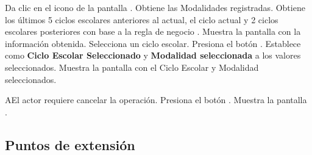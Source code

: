 \begin{UCtrayectoria}	

    \UCpaso[\UCactor] \label{cancelar}Da clic en el icono \IUEditar de la pantalla .
    \UCpaso Obtiene las Modalidades registradas.
    \UCpaso Obtiene los últimos 5 ciclos escolares anteriores al actual, el ciclo actual y 2 ciclos escolares posteriores con base a la regla de negocio .
    \UCpaso Muestra la pantalla  con la información obtenida.
    \UCpaso [\UCactor] Selecciona un ciclo escolar.
    \UCpaso [\UCactor] \label{IN-DES-CU2:acp} Presiona el botón . %
    \UCpaso Establece como {\bf Ciclo Escolar Seleccionado} y {\bf Modalidad seleccionada} a los valores seleccionados.
    \UCpaso Muestra la pantalla  con el Ciclo Escolar y Modalidad seleccionados.
\end{UCtrayectoria}

\begin{UCtrayectoriaA}{A}{El actor requiere cancelar la operación.}
\UCpaso Presiona el botón .
\UCpaso Muestra la pantalla .
\end{UCtrayectoriaA}

\subsection{Puntos de extensión}



